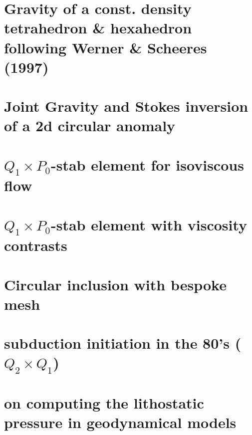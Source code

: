 \documentclass[a4paper,11pt]{report}
\begin{document}
\chapter{Gravity of a const. density tetrahedron \& hexahedron following Werner \& Scheeres (1997) \label{f113}} %

\chapter{Joint Gravity and Stokes inversion of a 2d circular anomaly \label{f114}} %

\chapter{$Q_1\times P_0$-stab element for isoviscous flow \label{f115}} %

\chapter{$Q_1\times P_0$-stab element with viscosity contrasts\label{f116}} %

\chapter{Circular inclusion with bespoke mesh \label{f117}} %

\chapter{subduction initiation in the 80's ($Q_2\times Q_1$) \label{f118}} %

\chapter{on computing the lithostatic pressure in geodynamical models \label{f119}} %
\end{document}
